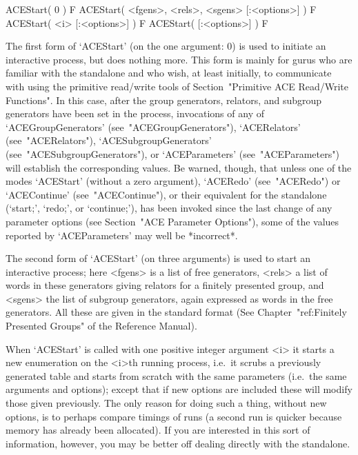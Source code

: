 
\beginitems

\>ACEStart( 0 ) F
\>ACEStart( <fgens>, <rels>, <sgens> [:<options>] ) F
\>ACEStart( <i> [:<options>] ) F
\>ACEStart( [:<options>] ) F

The first form of `ACEStart' (on the  one  argument:  0)  is  used  to
initiate an interactive {\ACE} process, but does  nothing  more.  This
form is mainly for gurus who are familiar with the  {\ACE}  standalone
and who wish, at least initially, to communicate with {\ACE} using the
primitive  read/write  tools  of  Section~"Primitive  ACE   Read/Write
Functions". In this case, after the group  generators,  relators,  and
subgroup generators have been set in the {\ACE}  process,  invocations
of    any    of    `ACEGroupGenerators'    (see~"ACEGroupGenerators"),
`ACERelators'       (see~"ACERelators"),       `ACESubgroupGenerators'
(see~"ACESubgroupGenerators"),           or            `ACEParameters'
(see~"ACEParameters") will establish the corresponding {\GAP}  values.
Be warned, though, that unless one of the modes `ACEStart' (without  a
zero   argument),   `ACERedo'   (see~"ACERedo")    or    `ACEContinue'
(see~"ACEContinue"), or their equivalent  for  the  standalone  {\ACE}
(`start;', `redo;', or `continue;'), has been invoked since  the  last
change of any parameter options (see Section~"ACE Parameter Options"),
some  of  the  values  reported  by  `ACEParameters'   may   well   be
*incorrect*.

The second form of `ACEStart' (on three arguments) is used to start an
interactive process; here <fgens> is a list of free generators, <rels>
a list of words in these generators giving  relators  for  a  finitely
presented group, and <sgens> the list of  subgroup  generators,  again
expressed as words in the free generators. All these are given in  the
standard {\GAP} format (See Chapter~"ref:Finitely Presented Groups" of
the {\GAP} Reference Manual).

When `ACEStart' is called with one positive integer  argument  <i>  it
starts a new enumeration on the <i>th running process, i.e.~it  scrubs
a previously generated table and starts from  scratch  with  the  same
parameters (i.e.~the same arguments and options); except that  if  new
options are included these will modify  those  given  previously.  The
only reason for doing such a thing, without new options, is to perhaps
compare timings of runs (a second run is quicker  because  memory  has
already been allocated).  If  you  are  interested  in  this  sort  of
information, however, you may be better off dealing directly with  the
standalone.

